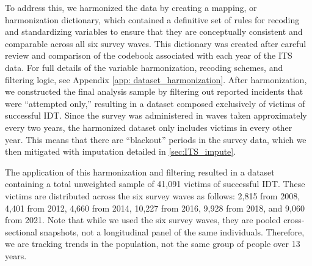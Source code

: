 To address this, we harmonized the data by creating a mapping, or harmonization dictionary, which contained a definitive set of rules for recoding and standardizing variables to ensure that they are conceptually consistent and comparable across all six survey waves. This dictionary was created after careful review and comparison of the codebook associated with each year of the ITS data. For full details of the variable harmonization, recoding schemes, and filtering logic, see Appendix \ref{app: dataset_harmonization}. After harmonization, we constructed the final analysis sample by filtering out reported incidents that were ``attempted only,'' resulting in a dataset composed exclusively of victims of successful IDT.
Since the survey was administered in waves taken approximately every two years, the harmonized dataset only includes victims in every other year. This means that there are ``blackout'' periods in the survey data, which we then mitigated with imputation detailed  in \ref{sec:ITS_impute}.

The application of this harmonization and filtering resulted in a dataset containing a total unweighted sample of 41,091 victims of successful IDT. These victims are distributed across the six survey waves as follows: 2,815 from 2008, 4,401 from 2012, 4,660 from 2014, 10,227 from 2016, 9,928 from 2018, and 9,060 from 2021. 
Note that while we used the six survey waves, they are pooled cross-sectional snapshots, not a longitudinal panel of the same individuals. Therefore, we are tracking trends in the population, not the same group of people over 13 years.

